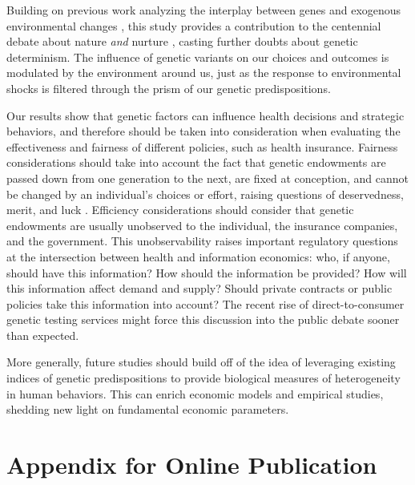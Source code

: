 \documentclass[11pt]{article}
\begin{document}
Building on previous work analyzing the interplay between genes and exogenous environmental changes \citep{Fletcher2012,Schmitz2017,Barcellos2018}, this study provides a contribution to the centennial debate about nature \textit{and} nurture \citep{Mulcaster1582,Galton1874,Haldane1946,Lundborg2010,Kong2018}, casting further doubts about genetic determinism.
The influence of genetic variants on our choices and outcomes is modulated by the environment around us, just as the response to environmental shocks is filtered through the prism of our genetic predispositions.

Our results show that genetic factors can influence health decisions and strategic behaviors, and therefore should be taken into consideration when evaluating the effectiveness and fairness of different policies, such as health insurance.
Fairness considerations should take into account the fact that genetic endowments are passed down from one generation to the next, are fixed at conception, and cannot be changed by an individual's choices or effort, raising questions of deservedness, merit, and luck \citep{Pereira2021,Harden2021,Kweon2020}.
Efficiency considerations should consider that genetic endowments are usually unobserved to the individual, the insurance companies, and the government.
This unobservability raises important regulatory questions at the intersection between health and information economics: who, if anyone, should have this information? How should the information be provided? How will this information affect demand and supply? Should private contracts or public policies take this information into account?
The recent rise of direct-to-consumer genetic testing services might force this discussion into the public debate sooner than expected.

More generally, future studies should build off of the idea of leveraging existing indices of genetic predispositions to provide biological measures of heterogeneity in human behaviors.
This can enrich economic models and empirical studies, shedding new light on fundamental economic parameters.



\singlespacing
%

%



\clearpage
\newpage

\appendix

\section{Appendix for Online Publication}



\end{document}
